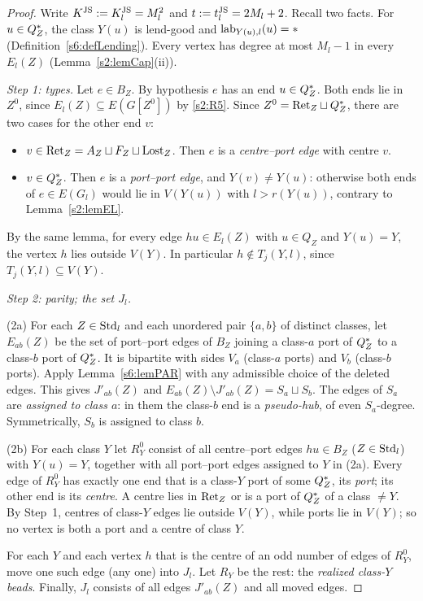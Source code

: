 \begin{proof}
Write $K^{\mathrm{JS}}:=K^{\mathrm{JS}}_l=M_l^2$ and $t:=t^{\mathrm{JS}}_l=2M_l+2$. Recall two facts. For $u\in Q^{*}_Z$, the class $Y(u)$ is lend-good and $\mathrm{lab}_{Y(u),l}(u)=*$ (Definition~\ref{s6:defLending}). Every vertex has degree at most $M_l-1$ in every $E_l(Z)$ (Lemma~\ref{s2:lemCap}(ii)).

\emph{Step 1: types.} Let $e\in B_Z$. By hypothesis $e$ has an end $u\in Q^{*}_Z$. Both ends lie in $Z^0$, since $E_l(Z)\subseteq E(G[Z^0])$ by \ref{s2:R5}. Since $Z^0=\mathrm{Ret}_Z\sqcup Q^{*}_Z$, there are two cases for the other end $v$:
\begin{itemize}
\item $v\in\mathrm{Ret}_Z=A_Z\sqcup F_Z\sqcup\mathrm{Lost}_Z$. Then $e$ is a \emph{centre--port edge} with centre $v$.
\item $v\in Q^{*}_Z$. Then $e$ is a \emph{port--port edge}, and $Y(v)\neq Y(u)$: otherwise both ends of $e\in E(G_l)$ would lie in $V(Y(u))$ with $l>r(Y(u))$, contrary to Lemma~\ref{s2:lemEL}.
\end{itemize}
By the same lemma, for every edge $hu\in E_l(Z)$ with $u\in Q_Z$ and $Y(u)=Y$, the vertex $h$ lies outside $V(Y)$. In particular $h\notin T_j(Y,l)$, since $T_j(Y,l)\subseteq V(Y)$.

\emph{Step 2: parity; the set $J_l$.}

(2a) For each $Z\in\mathrm{Std}_l$ and each unordered pair $\{a,b\}$ of distinct classes, let $E_{ab}(Z)$ be the set of port--port edges of $B_Z$ joining a class-$a$ port of $Q^{*}_Z$ to a class-$b$ port of $Q^{*}_Z$. It is bipartite with sides $V_a$ (class-$a$ ports) and $V_b$ (class-$b$ ports). Apply Lemma~\ref{s6:lemPAR} with any admissible choice of the deleted edges. This gives $J'_{ab}(Z)$ and $E_{ab}(Z)\setminus J'_{ab}(Z)=S_a\sqcup S_b$. The edges of $S_a$ are \emph{assigned to class $a$}: in them the class-$b$ end is a \emph{pseudo-hub}, of even $S_a$-degree. Symmetrically, $S_b$ is assigned to class $b$.

(2b) For each class $Y$ let $R^0_Y$ consist of all centre--port edges $hu\in B_Z$ ($Z\in\mathrm{Std}_l$) with $Y(u)=Y$, together with all port--port edges assigned to $Y$ in (2a). Every edge of $R^0_Y$ has exactly one end that is a class-$Y$ port of some $Q^{*}_Z$, its \emph{port}; its other end is its \emph{centre}. A centre lies in $\mathrm{Ret}_Z$ or is a port of $Q^{*}_Z$ of a class $\neq Y$. By Step~1, centres of class-$Y$ edges lie outside $V(Y)$, while ports lie in $V(Y)$; so no vertex is both a port and a centre of class $Y$.

For each $Y$ and each vertex $h$ that is the centre of an odd number of edges of $R^0_Y$, move one such edge (any one) into $J_l$. Let $R_Y$ be the rest: the \emph{realized class-$Y$ beads}. Finally, $J_l$ consists of all edges $J'_{ab}(Z)$ and all moved edges.


\end{proof}
